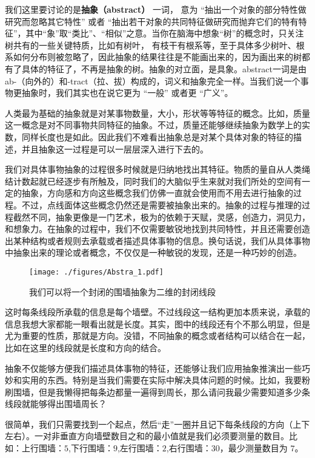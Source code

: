 
我们这里要讨论的是\textbf{抽象（abstract）} 一词， 意为 “抽出一个对象的部分特性做研究而忽略其它特性” 或者 “抽出若干对象的共同特征做研究而抛弃它们的特有特征”，其中“象”取“类比”、“相似”之意。当你在脑海中想象“树”的概念时，只关注树共有的一些关键特质，比如有树叶， 有枝干有根系等，至于具体多少树叶、根系如何分布则被忽略了，因此抽象的结果往往是不能画出来的，因为画出来的树都有了具体的特征了，不再是抽象的树。抽象的对立面，是具象。abstract一词是由ab-（向外的）和-tract（拉、拔）构成的，词义和抽象完全一样。当我们说一个事物更抽象时，我们其实也在说它更为 “一般” 或者更 “广义”。


人类最为基础的抽象就是对某事物数量，大小，形状等等特征的概念。比如，质量这一概念是对不同事物共同特征的抽象。不过，质量还能够继续抽象为数学上的实数，同样长度也是如此。因此我们不难看出抽象总是对某个具体对象的特征的描述，并且抽象这一过程是可以一层层深入进行下去的。

我们对具体事物抽象的过程很多时候就是归纳地找出其特征。物质的量自从人类绳结计数起就已经逐步有所触及，同时我们的大脑似乎生来就对我们所处的空间有一定的抽象，方向感和方向这些概念我们仿佛一直就会使用而不用去进行抽象的过程。不过，点线面体这些概念仍然还是需要被抽象出来的。抽象的过程与推理的过程截然不同，抽象更像是一门艺术，极为的依赖于天赋，灵感，创造力，洞见力，和想象力。在抽象的过程中，我们不仅需要敏锐地找到共同特性，并且还需要创造出某种结构或者规则去承载或者描述具体事物的信息。换句话说，我们从具体事物中抽象出来的理论或者概念，不仅仅是一种敏锐的发现，还是一种巧妙的创造。

\begin{figure}[ht]
\centering
\texttt{[image: ./figures/Abstra\_1.pdf]}
\caption{我们可以将一个封闭的围墙抽象为二维的封闭线段} \label{Abstra_fig1}
\end{figure}

这时每条线段所承载的信息是每个墙壁。不过线段这一结构更加本质来说，承载的信息我想大家都能一眼看出就是长度。其实，图中的线段还有个不那么明显，但是尤为重要的性质，那就是方向。没错，不同抽象的概念或者结构可以结合在一起，比如在这里的线段就是长度和方向的结合。

抽象不仅能够方便我们描述具体事物的特征，还能够让我们应用抽象推演出一些巧妙和实用的东西。特别是当我们需要在实际中解决具体问题的时候。比如，我要粉刷围墙，但是我懒得把每条边都量一遍得到周长，那么请问我最少需要知道多少条线段就能够得出围墙周长？

很简单，我们只需要找到一个起点，然后“走”一圈并且记下每条线段的方向（上下左右）。一对非垂直方向墙壁数目之和的最小值就是我们必须要测量的数目。比如：上行围墙：$5$,下行围墙：$9$,左行围墙：$2$,右行围墙：$30$，最少测量数目为 $7$。


